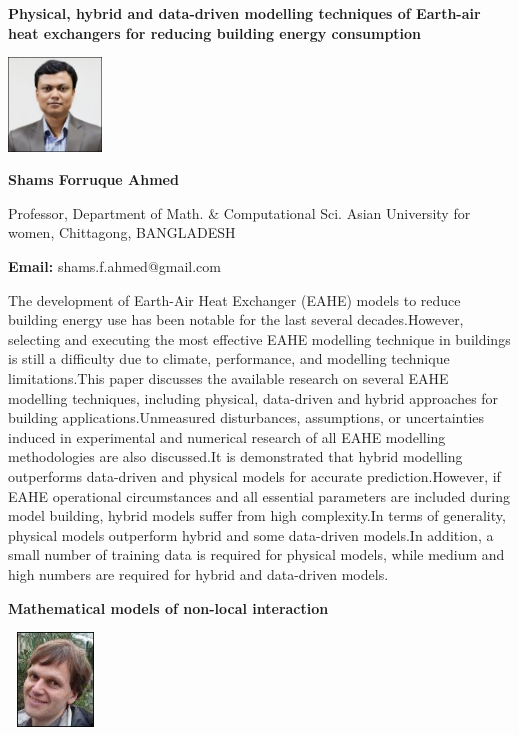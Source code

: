 \documentclass[twoside,11pt]{amsart}
\begin{document}
\vskip 10mm
\begin{center}\bf\LARGE
Physical, hybrid and data-driven modelling techniques of Earth-air heat exchangers for reducing building energy consumption
\end{center}
\vskip 5mm
\begin{center}
\includegraphics[width=2.5cm, height=2.5cm, keepaspectratio=false]{SFA.jpg}
\end{center}
\vskip 2mm
\centerline{\textbf{  Shams Forruque Ahmed}}
\vskip 2mm
\begin{flushleft}
Professor, Department of Math. \& Computational Sci. Asian University for women, Chittagong, BANGLADESH
\end{flushleft}
\vskip 2mm
\begin{flushleft}
{\bf Email:}  shams.f.ahmed@gmail.com
\end{flushleft}

\vskip 10mm
The development of Earth-Air Heat Exchanger (EAHE) models to reduce building energy use has been notable for the last several decades.However, selecting and executing the most effective EAHE modelling technique in buildings is still a difficulty due to climate, performance, and modelling technique limitations.This paper discusses the available research on several EAHE modelling techniques, including physical, data-driven and hybrid approaches for building applications.Unmeasured disturbances, assumptions, or uncertainties induced in experimental and numerical research of all EAHE modelling methodologies are also discussed.It is demonstrated that hybrid modelling outperforms data-driven and physical models for accurate prediction.However, if EAHE operational circumstances and all essential parameters are included during model building, hybrid models suffer from high complexity.In terms of generality, physical models outperform hybrid and some data-driven models.In addition, a small number of training data is required for physical models, while medium and high numbers are required for hybrid and data-driven models.
\vskip 5mm
\newpage
\vskip 10mm
\begin{center}\bf\LARGE
Mathematical models of non-local interaction
\end{center}
\vskip 5mm
\begin{center}
\includegraphics[width=2.5cm, height=2.5cm, keepaspectratio=false]{JM.jpg}
\end{center}
\vskip 2mm
\end{document}
